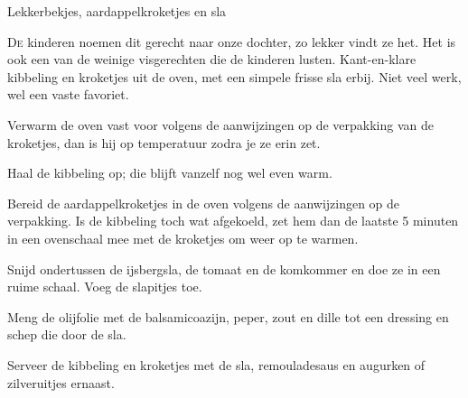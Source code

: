 \begin{recipe}{Lekkerbekjes, aardappelkroketjes en sla}


\lettrine{D}{e} kinderen noemen dit gerecht naar onze dochter, zo lekker vindt ze
het. Het is ook een van de weinige visgerechten die de kinderen lusten.
Kant-en-klare kibbeling en kroketjes uit de oven, met een simpele frisse sla
erbij. Niet veel werk, wel een vaste favoriet.

\begin{ingredients}
\end{ingredients}

\begin{steps}
  \item Verwarm de oven vast voor volgens de aanwijzingen op de verpakking van
        de kroketjes, dan is hij op temperatuur zodra je ze erin zet.
  \item Haal de kibbeling op; die blijft vanzelf nog wel even warm.
  \item Bereid de aardappelkroketjes in de oven volgens de aanwijzingen op de
        verpakking. Is de kibbeling toch wat afgekoeld, zet hem dan de laatste
        5 minuten in een ovenschaal mee met de kroketjes om weer op te warmen.
  \item Snijd ondertussen de ijsbergsla, de tomaat en de komkommer en doe ze in
        een ruime schaal. Voeg de slapitjes toe.
  \item Meng de olijfolie met de balsamicoazijn, peper, zout en dille tot een
        dressing en schep die door de sla.
  \item Serveer de kibbeling en kroketjes met de sla, remouladesaus en augurken
        of zilveruitjes ernaast.
\end{steps}
\end{recipe}
